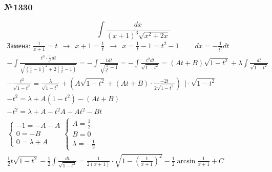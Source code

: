 \documentclass{article}
\begin{document}
\subsubsection{№1330}
\[
    \int \frac{dx}{(x + 1)^3 \sqrt{x^2 + 2x}}
\]
\begin{gather*}
    \text{Замена: } \frac{1}{x + 1} = t ~~\rightarrow~~ x + 1 = \frac{1}{t} ~~\rightarrow~~ x = \frac{1}{t} - 1 = t^2 - 1 ~~~~~~~~~~
    dx = -\frac{1}{t^2} dt \\
    -\int \frac{t^3 \cdot \frac{1}{t^2} dt}{\sqrt{\left(\frac{1}{t} - 1\right)^2 + 2\left(\frac{1}{t} - 1\right)}} =
    -\int \frac{tdt}{\sqrt{\frac{1}{t^2} - 1}} =
    -\int \frac{t^2 dt}{\sqrt{1 - t^2}} = 
    (At + B) \sqrt{1 - t^2} + \lambda \int \frac{dt}{\sqrt{1 - t^2}} \\
    -\frac{t^2}{\sqrt{1 - t^2}} = \frac{\lambda}{\sqrt{1 - t^2}} + \left(A \sqrt{1 - t^2} + (At + B) \cdot \frac{-2t}{2\sqrt{1 - t^2}}\right) ~~\big| \cdot \sqrt{1 - t^2} \\
    -t^2 = \lambda + A(1 - t^2) - (At + B) \\
    -t^2 = \lambda + A - t^2A - At^2 - Bt \\
    \begin{cases}
        -1 = -A - A \\
         0 = -B     \\
         0 = \lambda + A
    \end{cases}
    \begin{cases}
        A = \frac{1}{2} \\
        B = 0           \\
        \lambda = -\frac{1}{2}
    \end{cases} \\
    \frac{1}{2}t \sqrt{1 - t^2} - \frac{1}{2} \int \frac{dt}{\sqrt{1 - t^2}} = 
    \frac{1}{2(x + 1)} \cdot \sqrt{1 - \left(\frac{1}{x + 1}\right)^2} - \frac{1}{2} \arcsin \frac{1}{x + 1} + C
\end{gather*}
\end{document}
